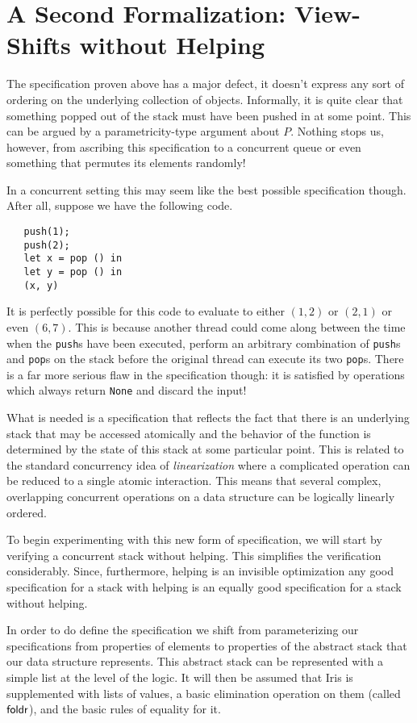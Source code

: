 \section{A Second Formalization: View-Shifts without Helping}

The specification proven above has a major defect, it doesn't express
any sort of ordering on the underlying collection of
objects. Informally, it is quite clear that something popped out of
the stack must have been pushed in at some point. This can be argued
by a parametricity-type argument about $P$. Nothing stops us, however,
from ascribing this specification to a concurrent queue or even
something that permutes its elements randomly!

In a concurrent setting this may seem like the best possible
specification though. After all, suppose we have the following code.
\begin{lstlisting}
   push(1);
   push(2);
   let x = pop () in
   let y = pop () in
   (x, y)
\end{lstlisting}
It is perfectly possible for this code to evaluate to either $(1, 2)$
or $(2, 1)$ or even $(6, 7)$. This is because another thread could
come along between the time when the {\tt push}s have been executed,
perform an arbitrary combination of {\tt push}s and {\tt pop}s on the
stack before the original thread can execute its two {\tt pop}s. There
is a far more serious flaw in the specification though: it is
satisfied by operations which always return {\tt None} and discard the
input!

What is needed is a specification that reflects the fact that there is
an underlying stack that may be accessed atomically and the behavior
of the function is determined by the state of this stack at some
particular point. This is related to the standard concurrency idea of
\emph{linearization} where a complicated operation can be reduced to a
single atomic interaction. This means that several complex,
overlapping concurrent operations on a data structure can be logically
linearly ordered.

To begin experimenting with this new form of specification, we will
start by verifying a concurrent stack without helping. This simplifies
the verification considerably. Since, furthermore, helping is an
invisible optimization any good specification for a stack with helping
is an equally good specification for a stack without helping.

In order to do define the specification we shift from parameterizing
our specifications from properties of elements to properties of the
abstract stack that our data structure represents. This abstract stack
can be represented with a simple list at the level of the logic. It
will then be assumed that Iris is supplemented with lists of values, a
basic elimination operation on them (called $\textsf{foldr}$), and
the basic rules of equality for it.

